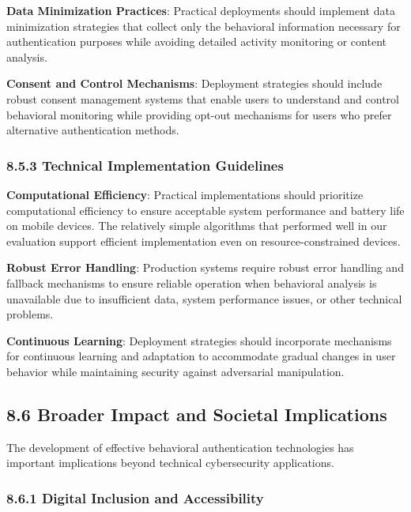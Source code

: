 \documentclass[
  11pt,
  a4paper,
]{article}
\begin{document}
\textbf{Data Minimization Practices}: Practical deployments should
implement data minimization strategies that collect only the behavioral
information necessary for authentication purposes while avoiding
detailed activity monitoring or content analysis.

\textbf{Consent and Control Mechanisms}: Deployment strategies should
include robust consent management systems that enable users to
understand and control behavioral monitoring while providing opt-out
mechanisms for users who prefer alternative authentication methods.

\subsubsection{8.5.3 Technical Implementation
Guidelines}\label{technical-implementation-guidelines}

\textbf{Computational Efficiency}: Practical implementations should
prioritize computational efficiency to ensure acceptable system
performance and battery life on mobile devices. The relatively simple
algorithms that performed well in our evaluation support efficient
implementation even on resource-constrained devices.

\textbf{Robust Error Handling}: Production systems require robust error
handling and fallback mechanisms to ensure reliable operation when
behavioral analysis is unavailable due to insufficient data, system
performance issues, or other technical problems.

\textbf{Continuous Learning}: Deployment strategies should incorporate
mechanisms for continuous learning and adaptation to accommodate gradual
changes in user behavior while maintaining security against adversarial
manipulation.

\subsection{8.6 Broader Impact and Societal
Implications}\label{broader-impact-and-societal-implications}

The development of effective behavioral authentication technologies has
important implications beyond technical cybersecurity applications.

\subsubsection{8.6.1 Digital Inclusion and
Accessibility}\label{digital-inclusion-and-accessibility}
\end{document}
